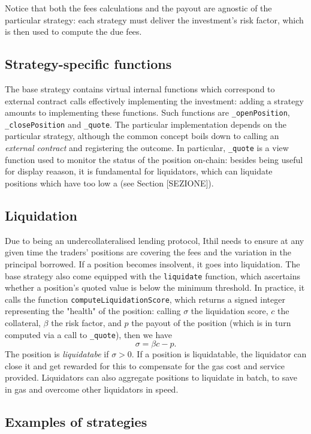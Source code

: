 \documentclass[a4paper,10 pt]{article}
\theoremstyle{definition}
\begin{document}
Notice that both the fees calculations and the payout are agnostic of the particular strategy: each strategy must deliver the investment's risk factor, which is then used to compute the due fees.

\subsection{Strategy-specific functions}

The base strategy contains virtual internal functions which correspond to external contract calls effectively implementing the investment: adding a strategy amounts to implementing these functions. Such functions are \verb|_openPosition|, \verb|_closePosition| and \verb|_quote|. The particular implementation depends on the particular strategy, although the common concept boils down to calling an {\it external contract} and registering the outcome. In particular, \verb|_quote| is a view function used to monitor the status of the position on-chain: besides being useful for display reaason, it is fundamental for liquidators, which can liquidate positions which have too low a (see Section [SEZIONE]).

\subsection{Liquidation}
Due to being an undercollateralised lending protocol, Ithil needs to ensure at any given time the traders' positions are covering the fees and the variation in the principal borrowed. If a position becomes insolvent, it goes into liquidation. \cite{arxivLiquidation}
The base strategy also come equipped with the \verb|liquidate| function, which ascertains whether a position's quoted value is below the minimum threshold. In practice, it calls the function \verb|computeLiquidationScore|, which returns a signed integer representing the "health" of the position: calling $\sigma$ the liquidation score, $c$ the collateral, $\beta$ the risk factor, and $p$ the payout of the position (which is in turn computed via a call to \verb|_quote|), then we have
$$\sigma = \beta c - p.$$
The position is {\it liquidatabe} if $\sigma > 0$. If a position is liquidatable, the liquidator can close it and get rewarded for this to compensate for the gas cost and service provided. Liquidators can also aggregate positions to liquidate in batch, to save in gas and overcome other liquidators in speed.

\subsection{Examples of strategies}
\end{document}
